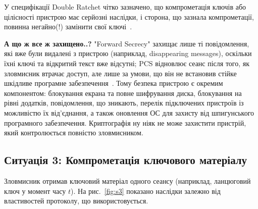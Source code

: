 У специфікації Double Ratchet чітко зазначено, що компрометація ключів або цілісності пристрою має серйозні 
наслідки, і сторона, що зазнала компрометації, повинна негайно(!) замінити свої ключі~\cite{signal_double_ratchet}.

\textbf{А що ж все ж захищено..?} "Forward Secrecy"{} захищає лише ті повідомлення, які вже були видалені з пристрою 
(наприклад, disappearing messages), оскільки їхні ключі та відкритий текст вже відсутні; PCS відновлює сеанс після 
того, як зловмисник втрачає доступ, але лише за умови, що він не встановив стійке шкідливе програмне забезпечення~\cite{signal_double_ratchet}. 
Тому безпека пристрою є окремим компонентом: блокування екрана та повне шифрування диска, блокування на рівні додатків, 
повідомлення, що зникають, перелік підключених пристроїв із можливістю їх від’єднання, а також оновлення ОС для 
захисту від шпигунського програмного забезпечення. Криптографія ну ніяк не може захистити пристрій, який 
контролюється повністю зловмисником.

\subsection{Ситуація 3: Компрометація ключового матеріалу}
\label{sec:s3}

Зловмисник отримав ключовий матеріал одного сеансу (наприклад, ланцюговий ключ у момент часу $t$). На рис.~\ref{fig:s3} 
показано наслідки залежно від властивостей протоколу, що використовується.

